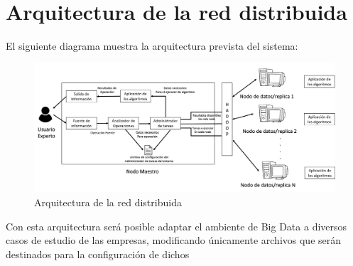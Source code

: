 \section{Arquitectura de la red distribuida}
El siguiente diagrama muestra la arquitectura prevista del sistema:
\begin{figure}[H]
	\hypertarget{fig:cap1}{\hspace{1pt}}
	\begin{center}
		\includegraphics[height=0.3\textheight]{capitulo1/images/im1.png}
		\caption{Arquitectura de la red distribuida}
		\label{fig:cap1}
	\end{center}
\end{figure}

Con esta arquitectura será posible adaptar el ambiente de Big Data a diversos casos de estudio de las empresas, modificando únicamente archivos que serán destinados para la configuración de dichos


